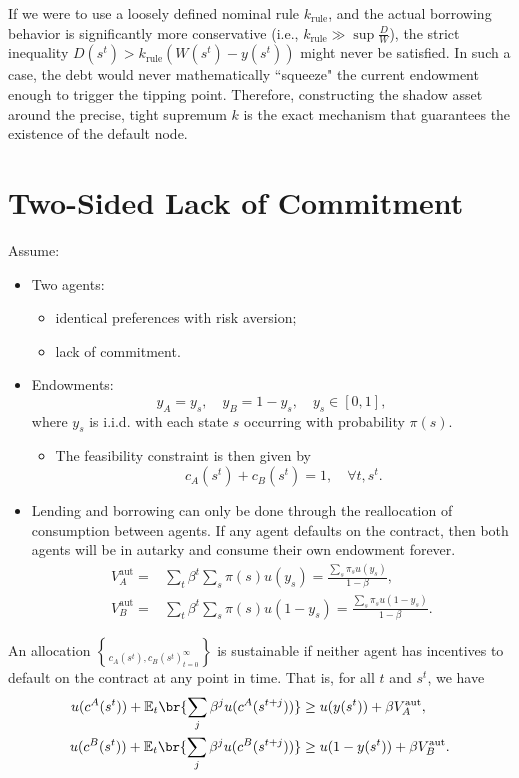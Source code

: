 {If we were to use a loosely defined nominal rule $k_{\text{rule}}$, and the actual borrowing behavior is significantly more conservative (i.e., $k_{\text{rule}} \gg \sup \frac{D}{W}$), the strict inequality $D(s^t) > k_{\text{rule}}\left(W(s^t) - y(s^t)\right)$ might never be satisfied. In such a case, the debt would never mathematically ``squeeze" the current endowment enough to trigger the tipping point. Therefore, constructing the shadow asset around the precise, tight supremum $k$ is the exact mechanism that guarantees the existence of the default node.
}

\section{Two-Sided Lack of Commitment}

Assume:
\begin{itemize}
    \item Two agents: 
    \begin{itemize}
        \item identical preferences with risk aversion; 
        \item lack of commitment.
    \end{itemize}
    \item Endowments: 
    \[
    y_A = y_s, \quad y_B = 1-y_s,\quad y_s\in [0,1],
    \]
    where $y_s$ is i.i.d. with each state $s$ occurring with probability $\pi(s)$.
    \begin{itemize}
        \item The feasibility constraint is then given by
        \[
        c_A(s^t) + c_B(s^t) = 1, \quad \forall t, s^t.
        \]
    \end{itemize}
    \item Lending and borrowing can only be done through the reallocation of consumption between agents. If any agent defaults on the contract, then both agents will be in autarky and consume their own endowment forever.
    \[
    \begin{aligned}
        V_A^{\text{aut}} = & \sum_t\beta^t \sum_s\pi(s) u(y_s)  = \frac{\sum_s\pi_su(y_s)}{1-\beta},\\
        V_B^{\text{aut}} = & \sum_t\beta^t \sum_s\pi(s) u(1-y_s)  = \frac{\sum_s\pi_su(1-y_s)}{1-\beta}.
    \end{aligned}
    \]
\end{itemize}

An allocation $\brace{c_A(s^t), c_B(s^t)}_{t=0}^\infty$ is sustainable if neither agent has incentives to default on the contract at any point in time. That is, for all $t$ and $s^t$, we have
\[
\begin{aligned}
    u(c^A(s^t))+\mathbb E_t\br{\sum_j\beta^ju(c^A(s^{t+j}))}&\ge u(y(s^t))+\beta V_A^{\text{aut}},\\
    u(c^B(s^t))+\mathbb E_t\br{\sum_j\beta^ju(c^B(s^{t+j}))}&\ge u(1-y(s^t))+\beta V_B^{\text{aut}}.
\end{aligned}
\]

